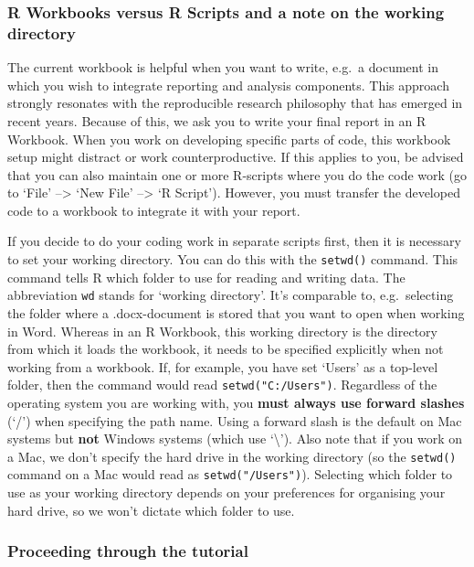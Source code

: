 \documentclass[
]{article}
\begin{document}
\hypertarget{r-workbooks-versus-r-scripts-and-a-note-on-the-working-directory}{%
\subsubsection{R Workbooks versus R Scripts and a note on the working
directory}\label{r-workbooks-versus-r-scripts-and-a-note-on-the-working-directory}}

The current workbook is helpful when you want to write, e.g.~a document
in which you wish to integrate reporting and analysis components. This
approach strongly resonates with the reproducible research philosophy
that has emerged in recent years. Because of this, we ask you to write
your final report in an R Workbook. When you work on developing specific
parts of code, this workbook setup might distract or work
counterproductive. If this applies to you, be advised that you can also
maintain one or more R-scripts where you do the code work (go to `File'
--\textgreater{} `New File' --\textgreater{} `R Script'). However, you
must transfer the developed code to a workbook to integrate it with your
report.

If you decide to do your coding work in separate scripts first, then it
is necessary to set your working directory. You can do this with the
\texttt{setwd()} command. This command tells R which folder to use for
reading and writing data. The abbreviation \texttt{wd} stands for
`working directory'. It's comparable to, e.g.~selecting the folder where
a .docx-document is stored that you want to open when working in Word.
Whereas in an R Workbook, this working directory is the directory from
which it loads the workbook, it needs to be specified explicitly when
not working from a workbook. If, for example, you have set `Users' as a
top-level folder, then the command would read
\texttt{setwd("C:/Users")}. Regardless of the operating system you are
working with, you \textbf{must always use forward slashes} (`/') when
specifying the path name. Using a forward slash is the default on Mac
systems but \textbf{not} Windows systems (which use `\textbackslash{}').
Also note that if you work on a Mac, we don't specify the hard drive in
the working directory (so the \texttt{setwd()} command on a Mac would
read as \texttt{setwd("/Users")}). Selecting which folder to use as your
working directory depends on your preferences for organising your hard
drive, so we won't dictate which folder to use.

\hypertarget{proceeding-through-the-tutorial}{%
\subsubsection{Proceeding through the
tutorial}\label{proceeding-through-the-tutorial}}
\end{document}

